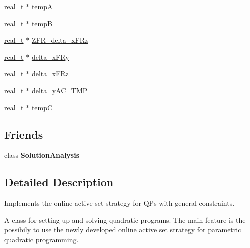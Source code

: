 \begin{DoxyCompactItemize}
\item 
\hyperlink{qp_o_a_s_e_s__wrapper_8h_a0d00e2b3dfadee81331bbb39068570c4}{real\+\_\+t} $\ast$ \hyperlink{class_q_problem_a6d03bae8b65750b03fb41f642e99ac83}{tempA}
\item 
\hyperlink{qp_o_a_s_e_s__wrapper_8h_a0d00e2b3dfadee81331bbb39068570c4}{real\+\_\+t} $\ast$ \hyperlink{class_q_problem_a576bbbc7847e72d00700610fbd0d9ce5}{tempB}
\item 
\hyperlink{qp_o_a_s_e_s__wrapper_8h_a0d00e2b3dfadee81331bbb39068570c4}{real\+\_\+t} $\ast$ \hyperlink{class_q_problem_a70a3a688b2ac0d3f5c51ea1112ffe6e2}{Z\+F\+R\+\_\+delta\+\_\+x\+F\+Rz}
\item 
\hyperlink{qp_o_a_s_e_s__wrapper_8h_a0d00e2b3dfadee81331bbb39068570c4}{real\+\_\+t} $\ast$ \hyperlink{class_q_problem_af88e0da3fce31851dfe3f40c565da46d}{delta\+\_\+x\+F\+Ry}
\item 
\hyperlink{qp_o_a_s_e_s__wrapper_8h_a0d00e2b3dfadee81331bbb39068570c4}{real\+\_\+t} $\ast$ \hyperlink{class_q_problem_a40b30d04725b2a901b1eed044fd371a2}{delta\+\_\+x\+F\+Rz}
\item 
\hyperlink{qp_o_a_s_e_s__wrapper_8h_a0d00e2b3dfadee81331bbb39068570c4}{real\+\_\+t} $\ast$ \hyperlink{class_q_problem_ae45447ddd6349c02648331e25302c08f}{delta\+\_\+y\+A\+C\+\_\+\+T\+MP}
\item 
\hyperlink{qp_o_a_s_e_s__wrapper_8h_a0d00e2b3dfadee81331bbb39068570c4}{real\+\_\+t} $\ast$ \hyperlink{class_q_problem_a1ae0a9468a7b21ccbb67362d7c000c41}{tempC}
\end{DoxyCompactItemize}
\subsection*{Friends}
\begin{DoxyCompactItemize}
\item 
\mbox{\label{class_q_problem_ab55a166adacbc90da27a86b0010c81d7}} 
class {\bfseries Solution\+Analysis}
\end{DoxyCompactItemize}


\subsection{Detailed Description}
Implements the online active set strategy for Q\+Ps with general constraints. 

A class for setting up and solving quadratic programs. The main feature is the possibily to use the newly developed online active set strategy for parametric quadratic programming.

